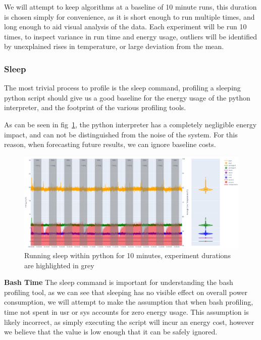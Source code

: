 We will attempt to keep algorithms at a baseline of 10 minute runs, this duration is chosen simply for convenience, as
it is short enough to run multiple times, and long enough to aid visual analysis of the data.
Each experiment will be run 10 times, to inspect variance in run time and energy usage, outliers will be identified by
unexplained rises in temperature, or large deviation from the mean.

\subsubsection{Sleep}
The most trivial process to profile is the sleep command, profiling a sleeping python script should give us a good
baseline for the energy usage of the python interpreter, and the footprint of the various profiling tools.

As can be seen in fig~\ref{fig:sleep_repeating}, the python interpreter has a completely negligible energy impact, and
can not be distinguished from the noise of the system.
For this reason, when forecasting future results, we can ignore baseline costs.

\begin{figure}[H]
    \centering
    \includegraphics[width=15cm]{figures/implementation/sleep_repetition}
    \caption{Running sleep within python for 10 minutes, experiment durations are highlighted in grey}
    \label{fig:sleep_repeating}
\end{figure}

\textbf{Bash Time}
The sleep command is important for understanding the bash profiling tool, as we can see that sleeping has no visible
effect on overall power consumption, we will attempt to make the assumption that when bash profiling, time not spent in
usr or sys accounts for zero energy usage.
This assumption is likely incorrect, as simply executing the script will incur an energy cost, however we believe that
the value is low enough that it can be safely ignored.

